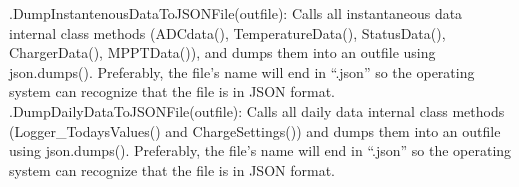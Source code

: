 .DumpInstantenousDataToJSONFile(outfile): Calls all instantaneous data internal class methods (ADCdata(), TemperatureData(), StatusData(), ChargerData(), MPPTData()), and dumps them into an outfile using json.dumps(). Preferably, the file’s name will end in “.json” so the operating system can recognize that the file is in JSON format. \\

.DumpDailyDataToJSONFile(outfile): Calls all daily data internal class methods (Logger\_TodaysValues() and ChargeSettings()) and dumps them into an outfile using json.dumps(). Preferably, the file’s name will end in “.json” so the operating system can recognize that the file is in JSON format. \\

